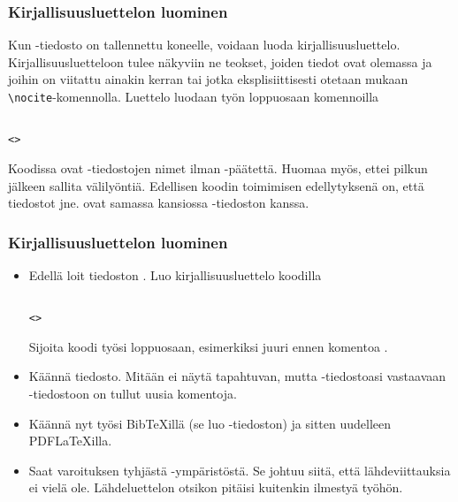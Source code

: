 \begin{fframe}
    \frametitle{Kirjallisuusluettelon luominen}
    Kun -tiedosto on tallennettu koneelle, voidaan luoda kirjallisuusluettelo. Kirjallisuusluetteloon tulee näkyviin ne teokset, joiden tiedot ovat olemassa ja joihin on viitattu ainakin kerran tai jotka eksplisiittisesti otetaan mukaan \lstinline-\nocite--komennolla.
    \pause
    \vaihto
    Luettelo luodaan työn loppuosaan komennoilla
    \begin{lstlisting}

<>
    \end{lstlisting}
    Koodissa  ovat -tiedostojen nimet ilman -päätettä. Huomaa myös, ettei pilkun jälkeen sallita välilyöntiä.
    \vaihto
    Edellisen koodin toimimisen edellytyksenä on, että tiedostot  jne. ovat samassa kansiossa -tiedoston kanssa. 
\end{fframe}

\begin{fframe}
    \frametitle{Kirjallisuusluettelon luominen}
    \begin{harj}
        \begin{itemize}
            \item Edellä loit tiedoston . Luo kirjallisuusluettelo koodilla 
                \begin{lstlisting}

<>
                \end{lstlisting}
                Sijoita koodi työsi loppuosaan, esimerkiksi juuri ennen komentoa \lstinline--.
            \item Käännä tiedosto. Mitään ei näytä tapahtuvan, mutta -tiedostoasi vastaavaan -tiedostoon on tullut uusia komentoja.
            \item Käännä nyt työsi BibTeXillä (se luo -tiedoston) ja sitten uudelleen PDFLaTeXilla.
            \item Saat varoituksen tyhjästä -ympäristöstä. Se johtuu siitä, että lähdeviittauksia ei vielä ole. Lähdeluettelon otsikon pitäisi kuitenkin ilmestyä työhön.
        \end{itemize}
    \end{harj}
\end{fframe}

